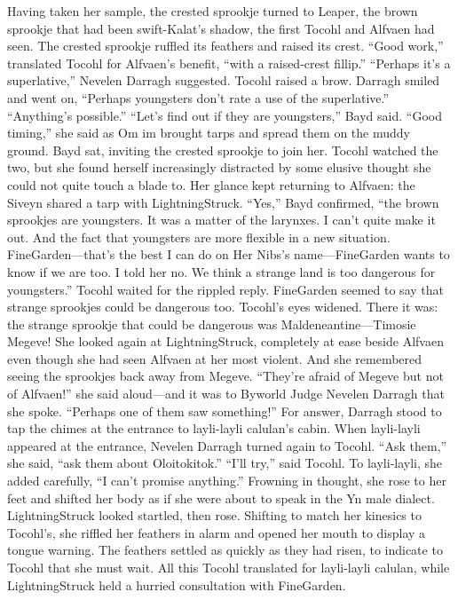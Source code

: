 \documentclass[9pt]{article}
\begin{document}
Having taken her sample, the crested sprookje turned to Leaper, the brown sprookje that had been
swift-Kalat’s shadow, the first Tocohl and Alfvaen had seen. The crested sprookje ruffled its feathers
and raised its crest. “Good work,” translated Tocohl for Alfvaen’s benefit, “with a raised-crest fillip.”
“Perhaps it’s a superlative,” Nevelen Darragh suggested. Tocohl raised a brow. Darragh smiled and
went on, “Perhaps youngsters don’t rate a use of the superlative.”
“Anything’s possible.”
“Let’s find out if they are youngsters,” Bayd said. “Good timing,” she said as Om im brought tarps
and spread them on the muddy ground. Bayd sat, inviting the crested sprookje to join her.
Tocohl watched the two, but she found herself increasingly distracted by some elusive thought she
could not quite touch a blade to. Her glance kept returning to Alfvaen: the Siveyn shared a tarp with
LightningStruck.
“Yes,” Bayd confirmed, “the brown sprookjes are youngsters. It was a matter of the larynxes. I can’t
quite make it out. And the fact that youngsters are more flexible in a new situation. FineGarden—that’s
the best I can do on Her Nibs’s name—FineGarden wants to know if we are too. I told her no. We
think a strange land is too dangerous for youngsters.”
Tocohl waited for the rippled reply. FineGarden seemed to say that strange sprookjes could be
dangerous too. Tocohl’s eyes widened. There it was: the strange sprookje that could be dangerous was
Maldeneantine—Timosie Megeve!
She looked again at LightningStruck, completely at ease beside Alfvaen even though she had seen
Alfvaen at her most violent. And she remembered seeing the sprookjes back away from Megeve.
“They’re afraid of Megeve but not of Alfvaen!” she said aloud—and it was to Byworld Judge
Nevelen Darragh that she spoke. “Perhaps one of them saw something!”
For answer, Darragh stood to tap the chimes at the entrance to layli-layli calulan’s cabin. When
layli-layli appeared at the entrance, Nevelen Darragh turned again to Tocohl. “Ask them,” she said, “ask
them about Oloitokitok.”
“I’ll try,” said Tocohl. To layli-layli, she added carefully, “I can’t promise anything.” Frowning in
thought, she rose to her feet and shifted her body as if she were about to speak in the Yn male dialect.
LightningStruck looked startled, then rose. Shifting to match her kinesics to Tocohl’s, she riffled her
feathers in alarm and opened her mouth to display a tongue warning. The feathers settled as quickly as
they had risen, to indicate to Tocohl that she must wait. All this Tocohl translated for layli-layli calulan,
while LightningStruck held a hurried consultation with FineGarden.
\end{document}
